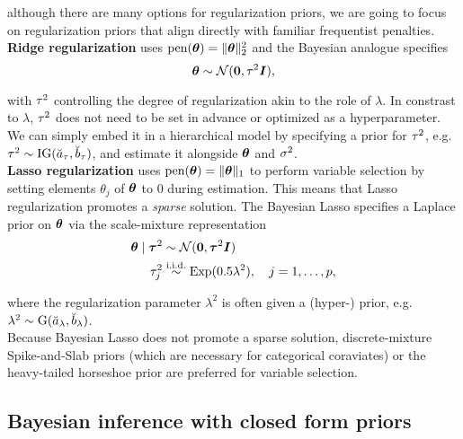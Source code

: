 although there are many options for regularization priors, we are going to focus on regularization priors that align directly with familiar frequentist penalties.\\

\textbf{Ridge regularization} \citep{hoerl_ridge_1970,hoerl_ridge_1970-1} uses $\text{pen}(\bm{\theta}) = \|\bm{\theta}\|_2^2$ and the Bayesian analogue  specifies
\begin{equation}\label{eq:ridge}
    \bm{\theta} \sim \mathcal{N}(\bm{0}, \tau^2 \bm{I}),
\end{equation}

with $\tau^2$ controlling the degree of regularization akin to the role of $\lambda$.
In constrast to $\lambda$, $\tau^2$ does not need to be set in advance or optimized as a hyperparameter.
We can simply embed it in a hierarchical model by specifying a prior for $\tau^2$, e.g. $\tau^2 \sim \text{IG}(\breve{a}_\tau, \breve{b}_\tau)$, and estimate it alongside $\bm{\theta}$ and $\sigma^2$.\\

\textbf{Lasso regularization} \citep{tibshirani_regression_1996} uses $\text{pen}(\bm{\theta}) = \|\bm{\theta}\|_1$ to perform variable selection by setting elements $\theta_j$ of $\bm{\theta}$ to $0$ during estimation.
This means that Lasso regularization promotes a \textit{sparse} solution.
The Bayesian Lasso specifies a Laplace prior on $\bm{\theta}$ via the scale-mixture representation \citep{park_bayesian_2008}
\begin{equation}\label{eq:lasso}
    \begin{aligned}
        \bm{\theta} \mid \bm{\tau}^2 &\sim \mathcal{N}(\bm{0}, \bm{\tau}^2 \bm{I}) \\
        \tau^2_j &\overset{\text{i.i.d.}}{\sim} \text{Exp}(0.5 \lambda^2), \quad j = 1, \dots, p,
    \end{aligned}
\end{equation}

where the regularization parameter $\lambda^2$ is often given a (hyper-) prior, e.g. $\lambda^2 \sim \text{G}(\breve{a}_\lambda, \breve{b}_\lambda)$.\\

Because Bayesian Lasso does not promote a sparse solution, discrete-mixture Spike-and-Slab priors \citep{mitchell_bayesian_1988} (which are necessary for categorical coraviates) or the heavy-tailed horseshoe prior \citep{carvalho_horseshoe_2010} are preferred for variable selection.

\subsection{Bayesian inference with closed form priors}

